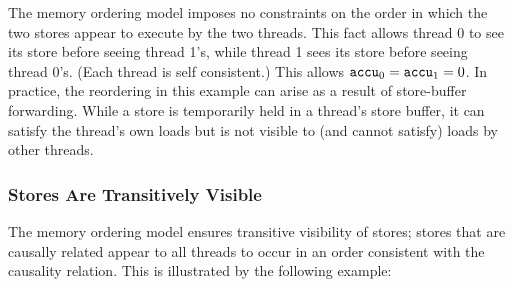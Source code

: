 \begin{table}[!hbt]
\noindent{}
\caption[Intra-Processor Forwarding is Allowed]{Intra-Processor Forwarding is Allowed \cite[Example 8-5]{ref:Intel}}
\label{tbl:litmus:intel:5}
\end{table}

\noindent
The memory ordering model imposes no constraints on the order in which the two stores appear to execute by the two threads.
This fact allows thread 0 to see its store before seeing thread 1's, while thread 1 sees its store before seeing thread 0's.
(Each thread is self consistent.)
This allows $\texttt{accu}_0 = \texttt{accu}_1 = 0$.
\bigbreak
\noindent
In practice, the reordering in this example can arise as a result of store-buffer forwarding.
While a store is temporarily held in a thread's store buffer, it can satisfy the thread's own loads but is not visible to (and cannot satisfy) loads by other threads.

\newpage

\subsubsection*{Stores Are Transitively Visible}

The memory ordering model ensures transitive visibility of stores; stores that are causally related appear to all threads to occur in an order consistent with the causality relation.
This is illustrated by the following example:

